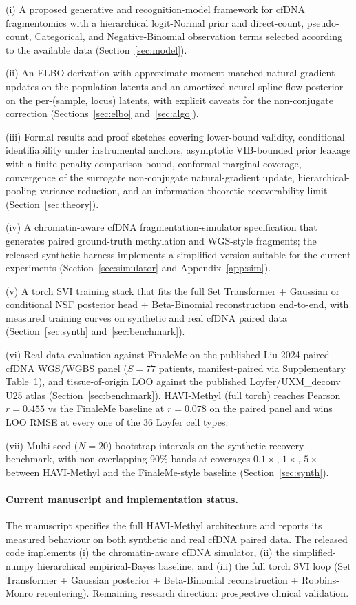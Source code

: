 \noindent (i) A proposed generative and recognition-model framework for cfDNA fragmentomics with a hierarchical logit-Normal prior and direct-count, pseudo-count, Categorical, and Negative-Binomial observation terms selected according to the available data (Section~\ref{sec:model}).

\noindent (ii) An ELBO derivation with approximate moment-matched natural-gradient updates on the population latents and an amortized neural-spline-flow posterior on the per-(sample, locus) latents, with explicit caveats for the non-conjugate correction (Sections~\ref{sec:elbo} and~\ref{sec:algo}).

\noindent (iii) Formal results and proof sketches covering lower-bound validity, conditional identifiability under instrumental anchors, asymptotic VIB-bounded prior leakage with a finite-penalty comparison bound, conformal marginal coverage, convergence of the surrogate non-conjugate natural-gradient update, hierarchical-pooling variance reduction, and an information-theoretic recoverability limit (Section~\ref{sec:theory}).

\noindent (iv) A chromatin-aware cfDNA fragmentation-simulator specification that generates paired ground-truth methylation and WGS-style fragments; the released synthetic harness implements a simplified version suitable for the current experiments (Section~\ref{sec:simulator} and Appendix~\ref{app:sim}).

\noindent (v) A torch SVI training stack that fits the full Set Transformer + Gaussian or conditional NSF posterior head + Beta-Binomial reconstruction end-to-end, with measured training curves on synthetic and real cfDNA paired data (Section~\ref{sec:synth} and~\ref{sec:benchmark}).

\noindent (vi) Real-data evaluation against FinaleMe on the published Liu 2024 paired cfDNA WGS/WGBS panel ($S=77$ patients, manifest-paired via Supplementary Table~1), and tissue-of-origin LOO against the published Loyfer/UXM\_deconv U25 atlas (Section~\ref{sec:benchmark}). HAVI-Methyl (full torch) reaches Pearson $r=0.455$ vs the FinaleMe baseline at $r=0.078$ on the paired panel and wins LOO RMSE at every one of the 36 Loyfer cell types.

\noindent (vii) Multi-seed ($N=20$) bootstrap intervals on the synthetic recovery benchmark, with non-overlapping 90\% bands at coverages $0.1\times$, $1\times$, $5\times$ between HAVI-Methyl and the FinaleMe-style baseline (Section~\ref{sec:synth}).

\paragraph{Current manuscript and implementation status.} The manuscript specifies the full HAVI-Methyl architecture and reports its measured behaviour on both synthetic and real cfDNA paired data. The released code implements (i) the chromatin-aware cfDNA simulator, (ii) the simplified-numpy hierarchical empirical-Bayes baseline, and (iii) the full torch SVI loop (Set Transformer + Gaussian posterior + Beta-Binomial reconstruction + Robbins-Monro recentering). Remaining research direction: prospective clinical validation.

